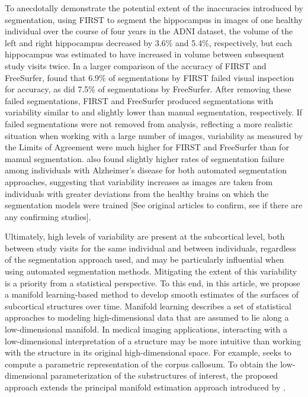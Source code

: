 \documentclass[11pt,reqno]{article}
\begin{document}
To anecdotally demonstrate the potential extent of the inaccuracies introduced by segmentation, using FIRST to segment the hippocampus in images of one healthy individual over the course of four years in the ADNI dataset, the volume of the left and right hippocampus decreased by 3.6\% and 5.4\%, respectively, but each hippocampus was estimated to have increased in volume between subsequent study visits twice. In a larger comparison of the accuracy of FIRST and FreeSurfer, \cite{mulderHippocampalVolumeChange2014} found that 6.9\% of segmentations by FIRST failed visual inspection for accuracy, as did 7.5\% of segmentations by FreeSurfer. After removing these failed segmentations, FIRST and FreeSurfer produced segmentations with variability similar to and slightly lower than manual segmentation, respectively. If failed segmentations were not removed from analysis, reflecting a more realistic situation when working with a large number of images, variability as measured by the Limits of Agreement were much higher for FIRST and FreeSurfer than for manual segmentation. \cite{mulderHippocampalVolumeChange2014} also found slightly higher rates of segmentation failure among individuals with Alzheimer's disease for both automated segmentation approaches, suggesting that variability increases as images are taken from individuals with greater deviations from the healthy brains on which the segmentation models were trained [See original articles to confirm, see if there are any confirming studies].

Ultimately, high levels of variability are present at the subcortical level, both between study visits for the same individual and between individuals, regardless of the segmentation approach used, and may be particularly influential when using automated segmentation methods. Mitigating the extent of this variability is a priority from a statistical perspective. To this end, in this article, we propose a manifold learning-based method to develop smooth estimates of the surfaces of subcortical structures over time. Manifold learning describes a set of statistical approaches to modeling high-dimensional data that are assumed to lie along a low-dimensional manifold. In medical imaging applications, interacting with a low-dimensional interpretation of a structure may be more intuitive than working with the structure in its original high-dimensional space. For example, \cite{yueParameterizationWhiteMatter2016} seeks to compute a parametric representation of the corpus callosum. To obtain the low-dimensional parameterization of the substructures of interest, the proposed approach extends the principal manifold estimation approach introduced by \cite{mengPrincipalManifoldEstimation2021}.
\end{document}
